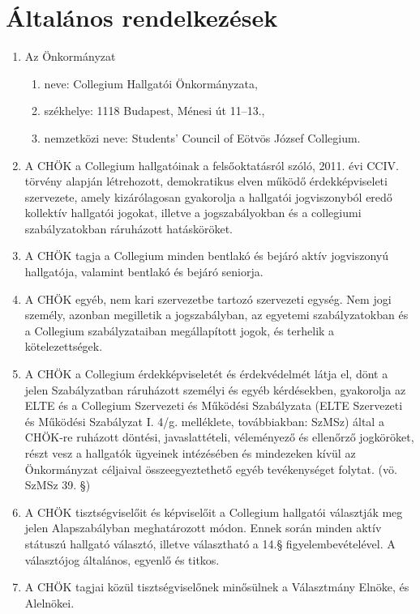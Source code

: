 \documentclass{../styles/rulebook}
\begin{document}
\section{Általános rendelkezések}
\begin{enumerate}
	\item Az Önkormányzat 
	\begin{enumerate}
		\item neve: Collegium Hallgatói Önkormányzata, 
		\item székhelye: 1118 Budapest, Ménesi út 11--13.,
		\item nemzetközi neve: Students’ Council of Eötvös József Collegium.
	\end{enumerate}
	\item A CHÖK a Collegium hallgatóinak a felsőoktatásról szóló, 2011. évi CCIV. törvény alapján létrehozott, demokratikus elven működő érdekképviseleti szervezete, amely kizárólagosan gyakorolja a hallgatói jogviszonyból eredő kollektív hallgatói jogokat, illetve a jogszabályokban és a collegiumi szabályzatokban ráruházott hatásköröket. 
	\item A CHÖK tagja a Collegium minden bentlakó és bejáró aktív jogviszonyú hallgatója, valamint bentlakó és bejáró seniorja.
	\item A CHÖK egyéb, nem kari szervezetbe tartozó szervezeti egység. Nem jogi személy, azonban megilletik a jogszabályban, az egyetemi szabályzatokban és a Collegium szabályzataiban megállapított jogok, és terhelik a kötelezettségek.
	\item A CHÖK a Collegium érdekképviseletét és érdekvédelmét látja el, dönt a jelen Szabályzatban ráruházott személyi és egyéb kérdésekben, gyakorolja az ELTE és a Collegium Szervezeti és Működési Szabályzata (ELTE Szervezeti és Működési Szabályzat I. 4/g. melléklete, továbbiakban: SzMSz) által a CHÖK-re ruházott döntési, javaslattételi, véleményező és ellenőrző jogköröket, részt vesz a hallgatók ügyeinek intézésében és mindezeken kívül az Önkormányzat céljaival összeegyeztethető egyéb tevékenységet folytat. (vö. SzMSz 39. §)
	\item A CHÖK tisztségviselőit és képviselőit a Collegium hallgatói választják meg jelen Alapszabályban meghatározott módon. Ennek során minden aktív státuszú hallgató választó, illetve választható a 14.§ figyelembevételével. A választójog általános, egyenlő és titkos.
	\item A CHÖK tagjai közül tisztségviselőnek minősülnek a Választmány Elnöke, és Alelnökei.
	
\end{enumerate}
\end{document}
